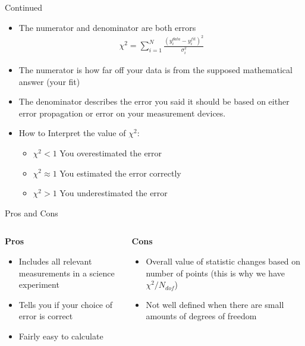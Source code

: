 \documentclass{beamer}
\begin{document}
\begin{frame}{Continued}
  \begin{itemize}
  \item The numerator and denominator are both errors
    \begin{align*}
      \chi^2=\sum_{i=1}^N\frac{(y_i^{data}-y_i^{fit})^2}{\sigma_i^2}
    \end{align*}
  \item The numerator is how far off your data is from the supposed mathematical answer (your fit)
  \item The denominator describes the error you said it should be based on either error propagation or error on your measurement devices.
  \item How to Interpret the value of $\chi^2$:
    \begin{itemize}
    \item $\chi^2<1$ You overestimated the error
    \item $\chi^2\approx1$ You estimated the error correctly
    \item $\chi^2>1$ You underestimated the error 
    \end{itemize}
  \end{itemize}
\end{frame}
\begin{frame}{Pros and Cons}
  \begin{columns}
    \begin{column}{0.5\textwidth}
      \textbf{Pros}
      \begin{itemize}
      \item Includes all relevant measurements in a science experiment
      \item Tells you if your choice of error is correct
      \item Fairly easy to calculate
      \end{itemize}
    \end{column}
    \begin{column}{0.5\textwidth}
      \textbf{Cons}
      \begin{itemize}
      \item Overall value of statistic changes based on number of points (this is why we have $\chi^2/N_{dof}$)
      \item Not well defined when there are small amounts of degrees of freedom
      \end{itemize}
    \end{column}
  \end{columns}
\end{frame}
\end{document}
